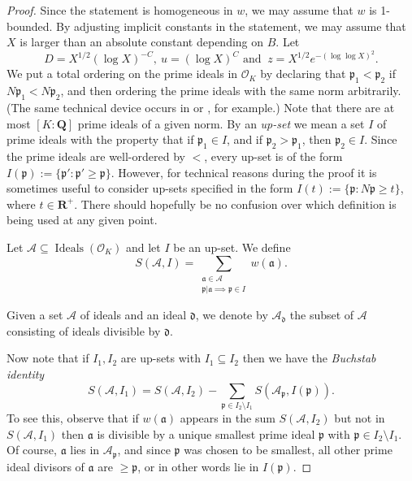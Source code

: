 \documentclass[11pt,reqno]{amsart}
\numberwithin{equation}{section}
\theoremstyle{definition}
\theoremstyle{remark}
\newcommand{\mc}{\mathcal}
\newcommand{\mf}{\mathfrak}
\renewcommand{\ge}{\geqslant}
\newcommand\Q{\mathbf{Q}}
\newcommand\R{\mathbf{R}}
\newcommand\Ideals{\operatorname{Ideals}}
\renewcommand\O{\mathcal{O}}
\begin{document}
\begin{proof} Since the statement is homogeneous in $w$, we may assume that $w$ is 1-bounded. By adjusting implicit constants in the statement, we may assume that $X$ is larger than an absolute constant depending on $B$. Let 
\begin{equation}\label{param-choices} D = X^{1/2}(\log X)^{-C}, ~u =(\log X)^{C}\text{ and }~z = X^{1/2}e^{-(\log\log X)^2}.\end{equation} We put a total ordering on the prime ideals in $\O_K$ by declaring that $\mf{p}_1 < \mf{p}_2$ if $N\mf{p}_1 < N\mf{p}_2$, and then ordering the prime ideals with the same norm arbitrarily. (The same technical device occurs in \cite[Section 4]{hb-moroz} or \cite[Section 6]{maynard-norm-forms}, for example.) Note that there are at most $[K : \Q]$ prime ideals of a given norm. By an \emph{up-set} we mean a set $I$ of prime ideals with the property that if $\mf{p}_1 \in I$, and if $\mf{p}_2 > \mf{p}_1$, then $\mf{p}_2 \in I$. Since the prime ideals are well-ordered by $<$, every up-set is of the form $I(\mf{p}) := \{ \mf{p}' : \mf{p}' \ge \mf{p}\}$. However, for technical reasons during the proof it is sometimes useful to consider up-sets specified in the form $I(t) := \{ \mf{p} : N \mf{p} \ge t\}$, where $t \in \R^+$. There should hopefully be no confusion over which definition is being used at any given point. 

Let $\mc{A} \subseteq\Ideals(\O_K)$ and let $I$ be an up-set. We define
\[S(\mc{A},I) = \sum_{\substack{\mf{a} \in \mc{A}\\ \mf{p} |\mf{a} \implies \mf{p} \in I}}w(\mf{a}).\]

Given a set $\mc{A}$ of ideals and an ideal $\mf{d}$, we denote by $\mc{A}_{\mf{d}}$ the subset of $\mc{A}$ consisting of ideals divisible by $\mf{d}$.

Now note that if $I_1, I_2$ are up-sets with $I_1 \subseteq I_2$ then we have the \emph{Buchstab identity}
\[ S(\mc{A}, I_1) = S(\mc{A}, I_2) - \sum_{\mf{p} \in I_2 \setminus I_1} S(\mc{A}_{\mf{p}}, I(\mf{p})).\]
To see this, observe that if $w(\mf{a})$ appears in the sum $S(\mc{A}, I_2)$ but not in $S(\mc{A}, I_1)$ then $\mf{a}$ is divisible by a unique smallest prime ideal $\mf{p}$ with $\mf{p} \in I_2 \setminus I_1$. Of course, $\mf{a}$ lies in $\mc{A}_{\mf{p}}$, and since $\mf{p}$ was chosen to be smallest, all other prime ideal divisors of $\mf{a}$ are $\ge \mf{p}$, or in other words lie in $I(\mf{p})$.



\end{proof}
\end{document}
